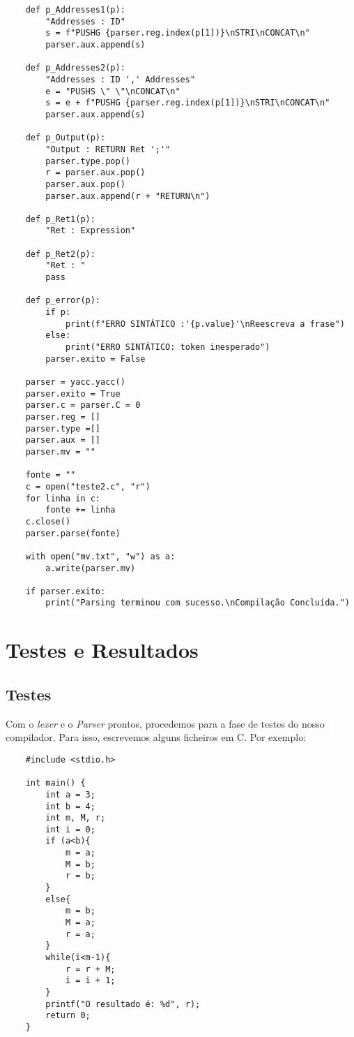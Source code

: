 \documentclass[12pt,a4paper]{report}
\begin{document}
\begin{lstlisting}
    def p_Addresses1(p):
        "Addresses : ID"
        s = f"PUSHG {parser.reg.index(p[1])}\nSTRI\nCONCAT\n"
        parser.aux.append(s)
    
    def p_Addresses2(p):
        "Addresses : ID ',' Addresses"
        e = "PUSHS \" \"\nCONCAT\n"
        s = e + f"PUSHG {parser.reg.index(p[1])}\nSTRI\nCONCAT\n"
        parser.aux.append(s)
    
    def p_Output(p):
        "Output : RETURN Ret ';'"
        parser.type.pop()
        r = parser.aux.pop()
        parser.aux.pop()
        parser.aux.append(r + "RETURN\n")
    
    def p_Ret1(p):
        "Ret : Expression"
    
    def p_Ret2(p):
        "Ret : "
        pass
    
    def p_error(p):
        if p:
            print(f"ERRO SINTÁTICO :'{p.value}'\nReescreva a frase")
        else:
            print("ERRO SINTÁTICO: token inesperado")
        parser.exito = False
    
    parser = yacc.yacc()
    parser.exito = True
    parser.c = parser.C = 0
    parser.reg = []
    parser.type =[]
    parser.aux = []
    parser.mv = ""
    
    fonte = ""
    c = open("teste2.c", "r")
    for linha in c:
        fonte += linha
    c.close()
    parser.parse(fonte)
    
    with open("mv.txt", "w") as a:
        a.write(parser.mv)
    
    if parser.exito:
        print("Parsing terminou com sucesso.\nCompilação Concluída.")
\end{lstlisting}

\chapter{Testes e Resultados}
\section{Testes}
Com o \emph{lexer} e o \emph{Parser} prontos, procedemos para a fase de testes do nosso compilador. Para isso, escrevemos alguns ficheiros em C. Por exemplo:
\begin{lstlisting}
    #include <stdio.h>

    int main() {
        int a = 3;
        int b = 4; 
        int m, M, r;
        int i = 0;
        if (a<b){
            m = a;
            M = b;
            r = b;
        }
        else{
            m = b;
            M = a;
            r = a;
        }
        while(i<m-1){
            r = r + M;
            i = i + 1;
        }
        printf("O resultado é: %d", r);
        return 0;
    }
\end{lstlisting}
\end{document}
